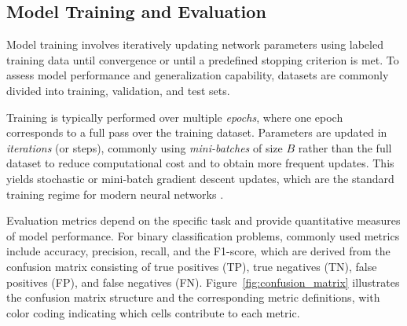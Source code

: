 \subsection{Model Training and Evaluation}

Model training involves iteratively updating network parameters using labeled training data until convergence or until a predefined stopping criterion is met. To assess model performance and generalization capability, datasets are commonly divided into training, validation, and test sets.

Training is typically performed over multiple \emph{epochs}, where one epoch corresponds to a full pass over the training dataset. Parameters are updated in \emph{iterations} (or steps), commonly using \emph{mini-batches} of size $B$ rather than the full dataset to reduce computational cost and to obtain more frequent updates. This yields stochastic or mini-batch gradient descent updates, 
which are the standard training regime for modern neural networks \cite{hammad2024artificialneuralnetworkdeep}.

Evaluation metrics depend on the specific task and provide quantitative measures of model performance. For binary classification problems, commonly used metrics include accuracy, precision, recall, and the F1-score, which are derived from the confusion matrix consisting of true positives (TP), true negatives (TN), false positives (FP), and false negatives (FN). Figure~\ref{fig:confusion_matrix} illustrates the confusion matrix structure and the corresponding metric definitions, with color coding indicating which cells contribute to each metric.

